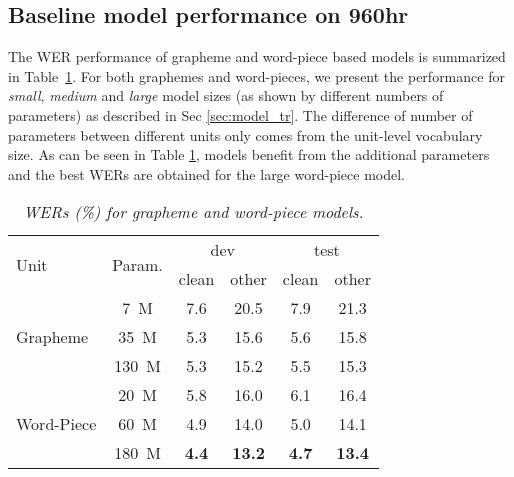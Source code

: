 \subsection{Baseline model performance on 960hr}
\vspace{-1mm}
The WER performance of grapheme and word-piece based models is summarized in
Table~\ref{baseline960}.
For both graphemes and word-pieces, we present the performance for \textit{small}, \textit{medium} and \textit{large}
model sizes (as shown by different numbers of parameters) as described in Sec \ref{sec:model_tr}. The difference of number of parameters between different units only comes from the unit-level vocabulary size.
As can be seen in Table \ref{baseline960}, models benefit from the additional parameters and the best
WERs are obtained for the large word-piece model.
\vspace{-2mm}
	\begin{table}[h]
		\centering
		\caption{\it WERs (\%) for grapheme and word-piece models.}
			 	\vspace{-2mm}
		\label{baseline960}
		\begin{tabular}{ |l|c|c|c|c|c|} \hline
			\multirow{2}{*}{Unit}      & \multirow{2}{*}{Param.}  & \multicolumn{2}{|c|}{dev} & \multicolumn{2}{|c|}{test}    \\ \cline{3-6}
			&   & clean & other & clean & other    \\ \hline
			\multirow{3}{*}{Grapheme}   & 7~M    & 7.6 & 20.5 & 7.9 & 21.3  \\
			& 35~M   & 5.3 & 15.6 & 5.6 & 15.8  \\
			& 130~M  & 5.3 & 15.2 & 5.5 & 15.3  \\ \hline
			\multirow{3}{*}{Word-Piece} & 20~M   & 5.8 & 16.0 & 6.1 & 16.4 \\
			& 60~M   & 4.9 & 14.0 & 5.0 & 14.1 \\
			& 180~M  & \textbf{4.4} & \textbf{13.2} & \textbf{4.7} & \textbf{13.4} \\ \hline
		\end{tabular}
	\end{table}

